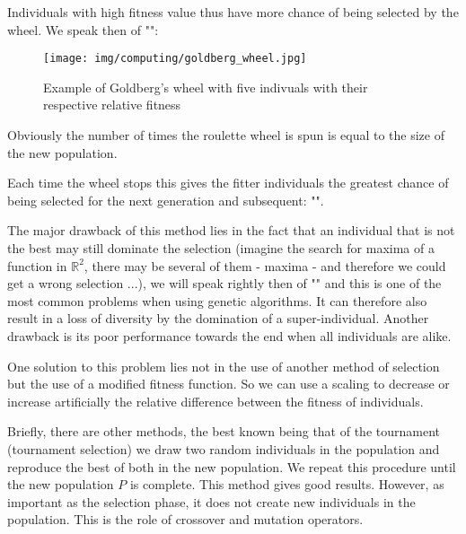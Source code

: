 	Individuals with high fitness value thus have more chance of being selected by the wheel. We speak then of "":
	\begin{figure}[H]
		\centering
		\texttt{[image: img/computing/goldberg\_wheel.jpg]}
		\caption{Example of Goldberg's wheel with five indivuals with their respective relative fitness}
	\end{figure}
	Obviously the number of times the roulette wheel is spun is equal to the size of the new population.

	Each time the wheel stops this gives the fitter individuals the greatest chance of being selected for the next generation and subsequent: "".

	The major drawback of this method lies in the fact that an individual that is not the best may still dominate the selection (imagine the search for maxima of a function in $\mathbb{R}^2$, there may be several of them - maxima - and therefore we could get a wrong selection ...), we will speak rightly then of "" and this is one of the most common problems when using genetic algorithms. It can therefore also result in a loss of diversity by the domination of a super-individual. Another drawback is its poor performance towards the end when all individuals are alike.

	One solution to this problem lies not in the use of another method of selection but the use of a modified fitness function. So we can use a scaling to decrease or increase artificially the relative difference between the fitness of individuals.

	Briefly, there are other methods, the best known being that of the tournament (tournament selection) we draw two random individuals in the population and reproduce the best of both in the new population. We repeat this procedure until the new population $P$ is complete. This method gives good results. However, as important as the selection phase, it does not create new individuals in the population. This is the role of crossover and mutation operators.
	
